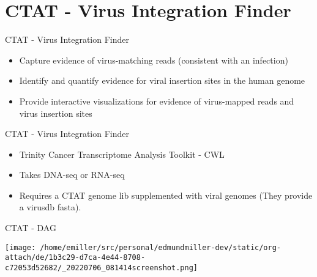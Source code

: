 \documentclass[bigger]{beamer}
\begin{document}
\section*{CTAT - Virus Integration Finder}
\label{sec:org7ba59a6}

\begin{frame}[label={sec:orgb474c1b}]{CTAT - Virus Integration Finder}
\begin{itemize}
\item Capture evidence of virus-matching reads (consistent with an infection)
\item Identify and quantify evidence for viral insertion sites in the human genome
\item Provide interactive visualizations for evidence of virus-mapped reads and
virus insertion sites
\end{itemize}
\end{frame}

\begin{frame}[label={sec:org425247d}]{CTAT - Virus Integration Finder}
\begin{itemize}
\item Trinity Cancer Transcriptome Analysis Toolkit - CWL
\item Takes DNA-seq or RNA-seq
\item Requires a CTAT genome lib supplemented with viral genomes (They provide a virusdb fasta).
\end{itemize}
\end{frame}

\begin{frame}[label={sec:org677bea4}]{CTAT - DAG}
\begin{center}
\texttt{[image: /home/emiller/src/personal/edmundmiller-dev/static/org-attach/de/1b3c29-d7ca-4e44-8708-c72053d52682/\_20220706\_081414screenshot.png]}
\end{center}
\end{frame}
\end{document}
